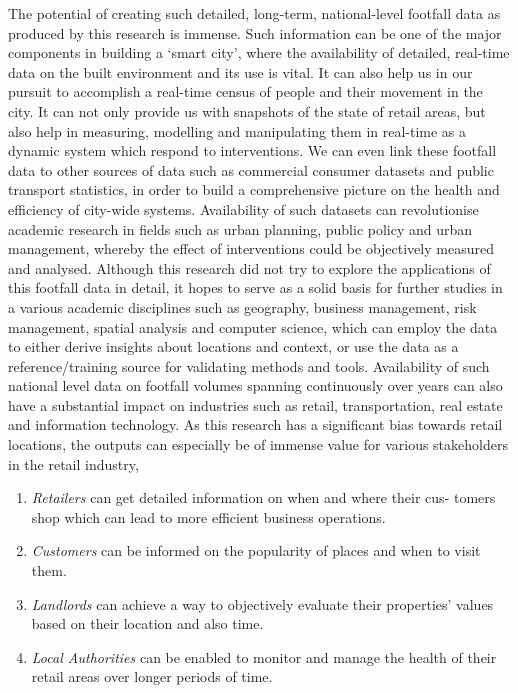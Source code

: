 The potential of creating such detailed, long-term, national-level footfall data as produced by this research is immense.
Such information can be one of the major components in building a `smart city', where the availability of detailed, real-time data on the built environment and its use is vital.
It can also help us in our pursuit to accomplish a real-time census of people and their movement in the city.
It can not only provide us with snapshots of the state of  retail areas, but also help in measuring, modelling and manipulating them in real-time as a dynamic system which respond to interventions.
We can even link these footfall data to other sources of data such as commercial consumer datasets and public transport statistics, in order to build a comprehensive picture on the health and efficiency of city-wide systems.
Availability of such datasets can revolutionise academic research in fields such as urban planning, public policy and urban management, whereby the effect of interventions could be objectively measured and analysed.
Although this research did not try to explore the applications of this footfall data in detail, it hopes to serve as a solid basis for further studies in a various academic disciplines such as geography, business management, risk management, spatial analysis and computer science, which can employ the data to either derive insights about locations and context, or use the data as a reference/training source for validating methods and tools.
Availability of such national level data on footfall volumes spanning continuously over years can also have a substantial impact on industries such as retail, transportation, real estate and information technology.
As this research has a significant bias towards retail locations, the outputs can especially be of immense value for various stakeholders in the retail industry,

\begin{enumerate}[leftmargin=2em, rightmargin=0.5em]
  \itemsep-0.25em
	\item \textit{Retailers} can get detailed information on when and where their cus- tomers shop which can lead to more efficient business operations.
	\item \textit{Customers} can be informed on the popularity of places and when to visit them.
	\item \textit{Landlords} can achieve a way to objectively evaluate their properties' values based on their location and also time.
	\item \textit{Local Authorities} can be enabled to monitor and manage the health of their retail areas over longer periods of time.
\end{enumerate}

